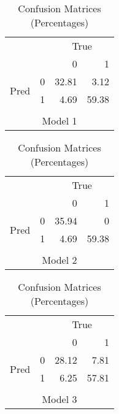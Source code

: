 \begin{table}[H]
    \begin{minipage}{.33\linewidth}
      \centering
        \begin{tabular}{lrrr}
	  &  & \multicolumn{2}{c}{True} \\
	& & 0 & 1 \\
           \multirow{ 2}{*}{Pred} & 0 & 32.81 & 3.12 \\
	 & 1 & 4.69 & 59.38 \\
	&&&\\
	 \multicolumn{4}{c}{Model 1}
        \end{tabular}
    \end{minipage}
    \begin{minipage}{.33\linewidth}
      \centering
        \begin{tabular}{lrrr}
	  & & \multicolumn{2}{c}{True} \\
	& & 0 & 1 \\
           \multirow{ 2}{*}{Pred} & 0 & 35.94 & 0 \\
	 & 1 & 4.69 & 59.38 \\
	&&&\\
	 \multicolumn{4}{c}{Model 2}
        \end{tabular}
    \end{minipage}
    \begin{minipage}{.33\linewidth}
      \centering
        \begin{tabular}{lrrr}
	  &  & \multicolumn{2}{c}{True} \\
	& & 0 & 1 \\
           \multirow{ 2}{*}{Pred} & 0 & 28.12 & 7.81 \\
	  & 1& 6.25 & 57.81 \\
	&&&\\
	 \multicolumn{4}{c}{Model 3}
        \end{tabular}
    \end{minipage}
    \caption{Confusion Matrices (Percentages) \label{table:conf_mat}}
\end{table}
